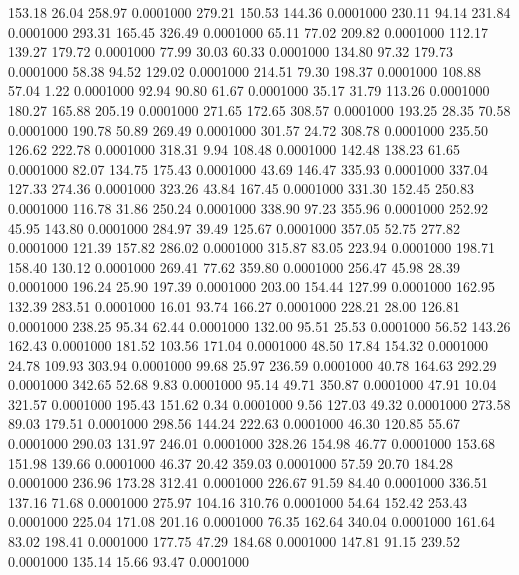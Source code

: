  153.18   26.04  258.97   0.0001000
 279.21  150.53  144.36   0.0001000
 230.11   94.14  231.84   0.0001000
 293.31  165.45  326.49   0.0001000
  65.11   77.02  209.82   0.0001000
 112.17  139.27  179.72   0.0001000
  77.99   30.03   60.33   0.0001000
 134.80   97.32  179.73   0.0001000
  58.38   94.52  129.02   0.0001000
 214.51   79.30  198.37   0.0001000
 108.88   57.04    1.22   0.0001000
  92.94   90.80   61.67   0.0001000
  35.17   31.79  113.26   0.0001000
 180.27  165.88  205.19   0.0001000
 271.65  172.65  308.57   0.0001000
 193.25   28.35   70.58   0.0001000
 190.78   50.89  269.49   0.0001000
 301.57   24.72  308.78   0.0001000
 235.50  126.62  222.78   0.0001000
 318.31    9.94  108.48   0.0001000
 142.48  138.23   61.65   0.0001000
  82.07  134.75  175.43   0.0001000
  43.69  146.47  335.93   0.0001000
 337.04  127.33  274.36   0.0001000
 323.26   43.84  167.45   0.0001000
 331.30  152.45  250.83   0.0001000
 116.78   31.86  250.24   0.0001000
 338.90   97.23  355.96   0.0001000
 252.92   45.95  143.80   0.0001000
 284.97   39.49  125.67   0.0001000
 357.05   52.75  277.82   0.0001000
 121.39  157.82  286.02   0.0001000
 315.87   83.05  223.94   0.0001000
 198.71  158.40  130.12   0.0001000
 269.41   77.62  359.80   0.0001000
 256.47   45.98   28.39   0.0001000
 196.24   25.90  197.39   0.0001000
 203.00  154.44  127.99   0.0001000
 162.95  132.39  283.51   0.0001000
  16.01   93.74  166.27   0.0001000
 228.21   28.00  126.81   0.0001000
 238.25   95.34   62.44   0.0001000
 132.00   95.51   25.53   0.0001000
  56.52  143.26  162.43   0.0001000
 181.52  103.56  171.04   0.0001000
  48.50   17.84  154.32   0.0001000
  24.78  109.93  303.94   0.0001000
  99.68   25.97  236.59   0.0001000
  40.78  164.63  292.29   0.0001000
 342.65   52.68    9.83   0.0001000
  95.14   49.71  350.87   0.0001000
  47.91   10.04  321.57   0.0001000
 195.43  151.62    0.34   0.0001000
   9.56  127.03   49.32   0.0001000
 273.58   89.03  179.51   0.0001000
 298.56  144.24  222.63   0.0001000
  46.30  120.85   55.67   0.0001000
 290.03  131.97  246.01   0.0001000
 328.26  154.98   46.77   0.0001000
 153.68  151.98  139.66   0.0001000
  46.37   20.42  359.03   0.0001000
  57.59   20.70  184.28   0.0001000
 236.96  173.28  312.41   0.0001000
 226.67   91.59   84.40   0.0001000
 336.51  137.16   71.68   0.0001000
 275.97  104.16  310.76   0.0001000
  54.64  152.42  253.43   0.0001000
 225.04  171.08  201.16   0.0001000
  76.35  162.64  340.04   0.0001000
 161.64   83.02  198.41   0.0001000
 177.75   47.29  184.68   0.0001000
 147.81   91.15  239.52   0.0001000
 135.14   15.66   93.47   0.0001000
